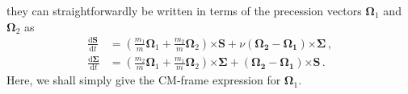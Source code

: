 \documentclass[
superscriptaddress,
preprint,
prd,tightenlines,showpacs,nofootinbib,
eqsecnum,
amsfonts,amsmath,amssymb]{revtex4-1}
\newcommand{\ud}{\mathrm{d}}
\begin{document}
they can straightforwardly be written in terms of the precession vectors
$\mathbf{\Omega}_1$ and $\mathbf{\Omega}_2$ as
%
\begin{subequations}
\begin{align}
\frac{\ud \mathbf{S}}{\ud t}&=\left(\frac{m_1}{m}\mathbf{\Omega}_1+
\frac{m_2}{m}\mathbf{\Omega}_2\right)\mathbf{\times S}+
\nu \left(\mathbf{\Omega_2-\mathbf{\Omega}_1}\right) \mathbf{\times \Sigma} \,
, \\
\frac{\ud \mathbf{\Sigma}}{\ud t}&=\left(\frac{m_2}{m}\mathbf{\Omega}_1+
\frac{m_1}{m}\mathbf{\Omega}_2\right)\mathbf{\times \Sigma}+ 
\left(\mathbf{\Omega_2-\mathbf{\Omega}_1}\right) \mathbf{\times S} \, .
\end{align}
\end{subequations}
%
Here, we shall simply give the CM-frame expression for $\mathbf{\Omega}_1$.
\end{document}
